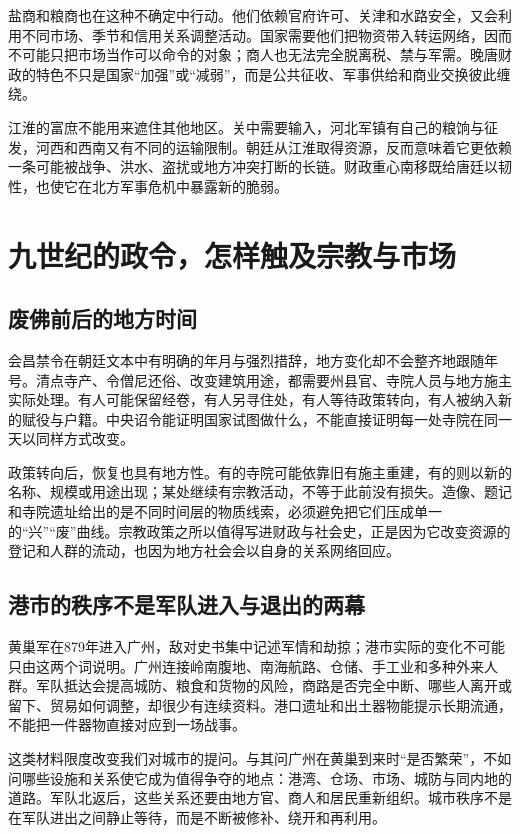 盐商和粮商也在这种不确定中行动。他们依赖官府许可、关津和水路安全，又会利用不同市场、季节和信用关系调整活动。国家需要他们把物资带入转运网络，因而不可能只把市场当作可以命令的对象；商人也无法完全脱离税、禁与军需。晚唐财政的特色不只是国家“加强”或“减弱”，而是公共征收、军事供给和商业交换彼此缠绕。

江淮的富庶不能用来遮住其他地区。关中需要输入，河北军镇有自己的粮饷与征发，河西和西南又有不同的运输限制。朝廷从江淮取得资源，反而意味着它更依赖一条可能被战争、洪水、盗扰或地方冲突打断的长链。财政重心南移既给唐廷以韧性，也使它在北方军事危机中暴露新的脆弱。

\section{九世纪的政令，怎样触及宗教与市场}

\subsection{废佛前后的地方时间}
会昌禁令在朝廷文本中有明确的年月与强烈措辞，地方变化却不会整齐地跟随年号。清点寺产、令僧尼还俗、改变建筑用途，都需要州县官、寺院人员与地方施主实际处理。有人可能保留经卷，有人另寻住处，有人等待政策转向，有人被纳入新的赋役与户籍。中央诏令能证明国家试图做什么，不能直接证明每一处寺院在同一天以同样方式改变。

政策转向后，恢复也具有地方性。有的寺院可能依靠旧有施主重建，有的则以新的名称、规模或用途出现；某处继续有宗教活动，不等于此前没有损失。造像、题记和寺院遗址给出的是不同时间层的物质线索，必须避免把它们压成单一的“兴”“废”曲线。宗教政策之所以值得写进财政与社会史，正是因为它改变资源的登记和人群的流动，也因为地方社会会以自身的关系网络回应。

\subsection{港市的秩序不是军队进入与退出的两幕}
黄巢军在879年进入广州，敌对史书集中记述军情和劫掠；港市实际的变化不可能只由这两个词说明。广州连接岭南腹地、南海航路、仓储、手工业和多种外来人群。军队抵达会提高城防、粮食和货物的风险，商路是否完全中断、哪些人离开或留下、贸易如何调整，却很少有连续资料。港口遗址和出土器物能提示长期流通，不能把一件器物直接对应到一场战事。

这类材料限度改变我们对城市的提问。与其问广州在黄巢到来时“是否繁荣”，不如问哪些设施和关系使它成为值得争夺的地点：港湾、仓场、市场、城防与同内地的道路。军队北返后，这些关系还要由地方官、商人和居民重新组织。城市秩序不是在军队进出之间静止等待，而是不断被修补、绕开和再利用。

